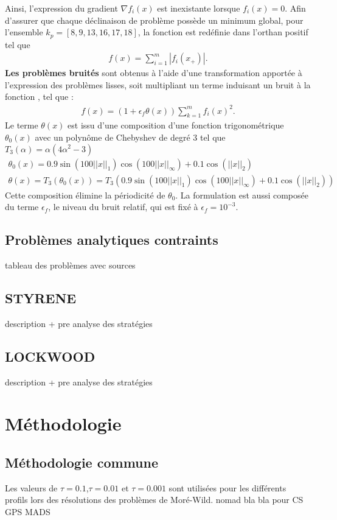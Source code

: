 	Ainsi, l'expression du gradient $\nabla f_i(x)$ est inexistante lorsque $f_i(x)=0$. Afin d'assurer que chaque déclinaison de problème possède un minimum global, pour l'ensemble $k_p = [8,9,13,16,17,18]$, la fonction est redéfinie dans l'orthan positif tel que
	\begin{gather*}
	f(x)=\sum_{i=1}^{m}{|f_i(x_+)|}.
	\end{gather*}
	\textbf{Les problèmes bruités} sont obtenus à l'aide d'une transformation apportée à l'expression des problèmes lisses, soit multipliant un terme induisant un bruit à la fonction , tel que : 
	\begin{gather*}
	f(x)=(1+\epsilon_{f}\theta(x))\sum_{k=1}^{m}{f_{i}(x)^{2}}.
	\end{gather*}
	Le terme $\theta(x)$ est issu d'une composition d'une fonction trigonométrique $\theta_0(x)$ avec un polynôme de Chebyshev de degré 3 tel que $T_{3}(\alpha) = \alpha(4\alpha^{2}-3)$
	\begin{gather*}
	\theta_0(x)=0.9\sin(100||x||_{1})\cos(100||x||_\infty)+0.1\cos(||x||_2) \\
	\theta(x) = T_3(\theta_0(x)) = T_{3}(0.9\sin(100||x||_{1})\cos(100||x||_\infty)+0.1\cos(||x||_2))
	\end{gather*} 
	Cette composition élimine la périodicité de $\theta_{0}$. La formulation est aussi composée du terme $\epsilon_f$, le niveau du bruit relatif, qui est fixé à $\epsilon_f = 10^{-3}$.  \\
	\subsection{Problèmes analytiques contraints}
	tableau des problèmes avec sources
	\subsection{STYRENE}
	description + pre analyse des stratégies
	\subsection{LOCKWOOD}
	description + pre analyse des stratégies
\section{Méthodologie}
	\subsection{Méthodologie commune}
	Les valeurs de $\tau = 0.1$,$\tau =  0.01$ et $ \tau = 0.001$ sont utilisées pour les différents profils lors des résolutions des problèmes de Moré-Wild. nomad bla bla pour CS GPS MADS\clearpage
